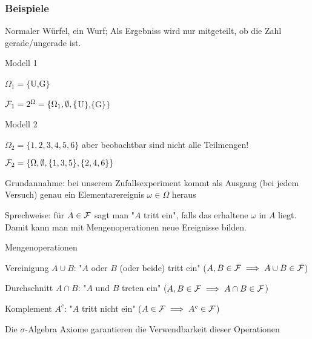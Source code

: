 \subsubsection{Beispiele}
Normaler Würfel, ein Wurf; Als Ergebniss wird nur mitgeteilt, ob die Zahl gerade/ungerade ist.
\enumstart
	\item Modell 1
	\enumstart
		\item $\Omega_1 = \{$U,G$\}$
		\item $\mathcal{F}_1 = 2^{\Omega} = \{\Omega_1, \emptyset, \{$U$\}$,$\{$G$\}\}$
	\enumend
	\item Modell 2
	\enumstart
		\item $\Omega_2 = \{1,2,3,4,5,6\}$ aber beobachtbar sind nicht alle Teilmengen!
		\item $\mathcal{F}_2 = \{\Omega, \emptyset, \{1,3,5\},\{2,4,6\}\}$
	\enumend
	\item Grundannahme: bei unserem Zufallsexperiment kommt als Ausgang (bei jedem Versuch)  genau ein Elementarereignis $\omega \in \Omega$ heraus
	\item Sprechweise: für $A \in \mathcal{F}$ sagt man "$A$ tritt ein", falls das erhaltene $\omega$ in $A$ liegt. Damit kann man mit Mengenoperationen neue Ereignisse bilden.
	\item Mengenoperationen
	\enumstart
		\item Vereinigung $A \cup B$: "$A$ oder $B$ (oder beide) tritt ein" ($A,B \in \mathcal{F} \implies A \cup B \in \mathcal{F}$)
		\item Durchschnitt $A \cap B$: "$A$ und $B$ treten ein" ($A,B \in \mathcal{F} \implies A \cap B \in \mathcal{F}$)
		\item Komplement $A^c$: "$A$ tritt nicht ein" ($A \in \mathcal{F} \implies A^c \in \mathcal{F}$)
		\item Die $\sigma$-Algebra Axiome garantieren die Verwendbarkeit dieser Operationen
	\enumend
\enumend


